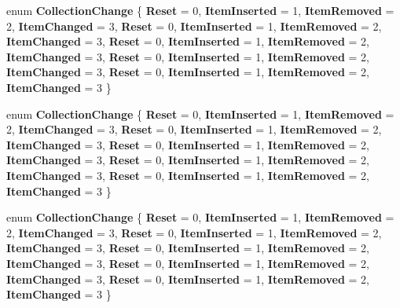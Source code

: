 \begin{DoxyCompactItemize}
enum {\bfseries Collection\+Change} \{ \newline
{\bfseries Reset} = 0, 
{\bfseries Item\+Inserted} = 1, 
{\bfseries Item\+Removed} = 2, 
{\bfseries Item\+Changed} = 3, 
\newline
{\bfseries Reset} = 0, 
{\bfseries Item\+Inserted} = 1, 
{\bfseries Item\+Removed} = 2, 
{\bfseries Item\+Changed} = 3, 
\newline
{\bfseries Reset} = 0, 
{\bfseries Item\+Inserted} = 1, 
{\bfseries Item\+Removed} = 2, 
{\bfseries Item\+Changed} = 3, 
\newline
{\bfseries Reset} = 0, 
{\bfseries Item\+Inserted} = 1, 
{\bfseries Item\+Removed} = 2, 
{\bfseries Item\+Changed} = 3, 
\newline
{\bfseries Reset} = 0, 
{\bfseries Item\+Inserted} = 1, 
{\bfseries Item\+Removed} = 2, 
{\bfseries Item\+Changed} = 3
 \}
\item 
\mbox{\label{namespace_windows_1_1_foundation_1_1_collections_a7bfda33cd0406e655136bb5f3c756232}} 
enum {\bfseries Collection\+Change} \{ \newline
{\bfseries Reset} = 0, 
{\bfseries Item\+Inserted} = 1, 
{\bfseries Item\+Removed} = 2, 
{\bfseries Item\+Changed} = 3, 
\newline
{\bfseries Reset} = 0, 
{\bfseries Item\+Inserted} = 1, 
{\bfseries Item\+Removed} = 2, 
{\bfseries Item\+Changed} = 3, 
\newline
{\bfseries Reset} = 0, 
{\bfseries Item\+Inserted} = 1, 
{\bfseries Item\+Removed} = 2, 
{\bfseries Item\+Changed} = 3, 
\newline
{\bfseries Reset} = 0, 
{\bfseries Item\+Inserted} = 1, 
{\bfseries Item\+Removed} = 2, 
{\bfseries Item\+Changed} = 3, 
\newline
{\bfseries Reset} = 0, 
{\bfseries Item\+Inserted} = 1, 
{\bfseries Item\+Removed} = 2, 
{\bfseries Item\+Changed} = 3
 \}
\item 
\mbox{\label{namespace_windows_1_1_foundation_1_1_collections_a7bfda33cd0406e655136bb5f3c756232}} 
enum {\bfseries Collection\+Change} \{ \newline
{\bfseries Reset} = 0, 
{\bfseries Item\+Inserted} = 1, 
{\bfseries Item\+Removed} = 2, 
{\bfseries Item\+Changed} = 3, 
\newline
{\bfseries Reset} = 0, 
{\bfseries Item\+Inserted} = 1, 
{\bfseries Item\+Removed} = 2, 
{\bfseries Item\+Changed} = 3, 
\newline
{\bfseries Reset} = 0, 
{\bfseries Item\+Inserted} = 1, 
{\bfseries Item\+Removed} = 2, 
{\bfseries Item\+Changed} = 3, 
\newline
{\bfseries Reset} = 0, 
{\bfseries Item\+Inserted} = 1, 
{\bfseries Item\+Removed} = 2, 
{\bfseries Item\+Changed} = 3, 
\newline
{\bfseries Reset} = 0, 
{\bfseries Item\+Inserted} = 1, 
{\bfseries Item\+Removed} = 2, 
{\bfseries Item\+Changed} = 3
 \}
\end{DoxyCompactItemize}

